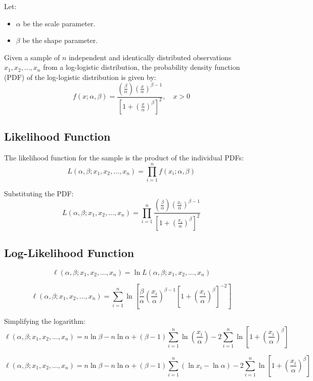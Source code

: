 \documentclass{article}
\begin{document}
Let:
\begin{itemize}
    \item $\alpha$ be the scale parameter.
    \item $\beta$ be the shape parameter.
\end{itemize}

Given a sample of $n$ independent and identically distributed observations $x_1, x_2, \ldots, x_n$ from a log-logistic distribution, the probability density function (PDF) of the log-logistic distribution is given by:
\[
f(x; \alpha, \beta) = \frac{\left(\frac{\beta}{\alpha}\right) \left(\frac{x}{\alpha}\right)^{\beta-1}}{\left[1 + \left(\frac{x}{\alpha}\right)^{\beta}\right]^2}, \quad x > 0
\]

\subsection*{Likelihood Function}

The likelihood function for the sample is the product of the individual PDFs:
\[
L(\alpha, \beta; x_1, x_2, \ldots, x_n) = \prod_{i=1}^{n} f(x_i; \alpha, \beta)
\]

Substituting the PDF:
\[
L(\alpha, \beta; x_1, x_2, \ldots, x_n) = \prod_{i=1}^{n} \frac{\left(\frac{\beta}{\alpha}\right) \left(\frac{x_i}{\alpha}\right)^{\beta-1}}{\left[1 + \left(\frac{x_i}{\alpha}\right)^{\beta}\right]^2}
\]

\subsection*{Log-Likelihood Function}

\[
\ell(\alpha, \beta; x_1, x_2, \ldots, x_n) = \ln L(\alpha, \beta; x_1, x_2, \ldots, x_n)
\]

\[
\ell(\alpha, \beta; x_1, x_2, \ldots, x_n) = \sum_{i=1}^{n} \ln \left[ \frac{\beta}{\alpha} \left(\frac{x_i}{\alpha}\right)^{\beta-1} \left[1 + \left(\frac{x_i}{\alpha}\right)^{\beta}\right]^{-2} \right]
\]

Simplifying the logarithm:
\[
\ell(\alpha, \beta; x_1, x_2, \ldots, x_n) = n \ln \beta - n \ln \alpha + (\beta-1) \sum_{i=1}^{n} \ln \left(\frac{x_i}{\alpha}\right) - 2 \sum_{i=1}^{n} \ln \left[1 + \left(\frac{x_i}{\alpha}\right)^{\beta}\right]
\]

\[
\ell(\alpha, \beta; x_1, x_2, \ldots, x_n) = n \ln \beta - n \ln \alpha + (\beta-1) \sum_{i=1}^{n} (\ln x_i - \ln \alpha) - 2 \sum_{i=1}^{n} \ln \left[1 + \left(\frac{x_i}{\alpha}\right)^{\beta}\right]
\]
\end{document}

